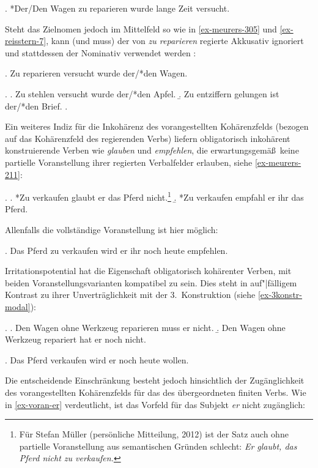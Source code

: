 \ex. *Der/Den Wagen zu reparieren wurde lange Zeit versucht.\\
\citep[(315b)]{Meurers:99} \label{ex-meurers-315} 

Steht das Zielnomen jedoch im Mittelfeld so wie in \ref{ex-meurers-305} und \ref{ex-reisstern-7}, kann (und muss) der von {\it zu reparieren} regierte Akkusativ ignoriert und stattdessen der Nominativ verwendet werden \citep{Pollard:94}:  

\ex. Zu reparieren versucht wurde der/*den Wagen. \hfill \citep[(305)]{Meurers:99} \label{ex-meurers-305} 

\ex. \label{ex-reisstern-7}
\a. Zu stehlen versucht wurde der/*den Apfel.
\b. Zu entziffern gelungen ist der/*den Brief.
\z. \citep[(7)]{Reis:Sternefeld:04}

Ein weiteres Indiz für die Inkohärenz des vorangestellten Kohärenzfelds (bezogen auf das Kohärenzfeld des regierenden Verbs) liefern obligatorisch inkohärent konstruierende Verben wie {\it glauben} und {\it empfehlen}, die erwartungsgemä\ss\ keine partielle Voranstellung ihrer regierten Verbalfelder erlauben, siehe \ref{ex-meurers-211}: 

\ex. \label{ex-meurers-211}
\a. *Zu verkaufen glaubt er das Pferd nicht.\footnote{Für Stefan Müller (persönliche Mitteilung, 2012) ist der Satz auch ohne partielle Voranstellung aus semantischen Gründen schlecht: {\it Er glaubt, das Pferd nicht zu verkaufen.}} \hfill \citep[(211)]{Meurers:99}
\b. *Zu verkaufen empfahl er ihr das Pferd. \hfill \citep[(205c)]{Meurers:99}

Allenfalls die vollständige Voranstellung ist hier möglich:

\ex. Das Pferd zu verkaufen wird er ihr noch heute empfehlen.\\
\citep[(212c)]{Meurers:99}

Irritationspotential hat die Eigenschaft obligatorisch kohärenter Verben, mit beiden Voranstellungsvarianten kompatibel zu sein. Dies steht in auf"|fälligem Kontrast zu ihrer Unverträglichkeit mit der 3.~Konstruktion (siehe \ref{ex-3konstr-modal}): 

\ex. 
\a. Den Wagen ohne Werkzeug reparieren muss er nicht.
\b. Den Wagen ohne Werkzeug repariert hat er noch nicht.

\ex. Das Pferd verkaufen wird er noch heute wollen. \hfill \citep[(212a)]{Meurers:99}

Die entscheidende Einschränkung besteht jedoch hinsichtlich der Zugänglichkeit des vorangestellten Kohärenzfelds für das  des übergeordneten finiten Verbs. Wie in \ref{ex-voran-er} verdeutlicht, ist das Vorfeld für das Subjekt {\it er} nicht zugänglich:

